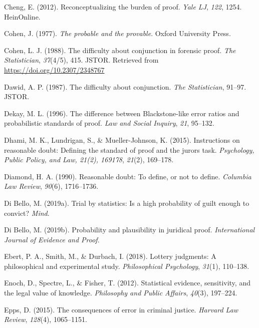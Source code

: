 \documentclass[10pt,dvipsnames,enabledeprecatedfontcommands]{scrartcl}
\begin{document}
\leavevmode\hypertarget{ref-cheng2012reconceptualizing}{}%
Cheng, E. (2012). Reconceptualizing the burden of proof. \emph{Yale LJ},
\emph{122}, 1254. HeinOnline.

\leavevmode\hypertarget{ref-Cohen1977The-probable-an}{}%
Cohen, J. (1977). \emph{The probable and the provable}. Oxford
University Press.

\leavevmode\hypertarget{ref-cohen1988difficulty}{}%
Cohen, L. J. (1988). The difficulty about conjunction in forensic proof.
\emph{The Statistician}, \emph{37}(4/5), 415. JSTOR. Retrieved from
\url{https://doi.org/10.2307/2348767}

\leavevmode\hypertarget{ref-dawid1987difficulty}{}%
Dawid, A. P. (1987). The difficulty about conjunction. \emph{The
Statistician}, 91--97. JSTOR.

\leavevmode\hypertarget{ref-Dekay1996}{}%
Dekay, M. L. (1996). The difference between Blackstone-like error ratios
and probabilistic standards of proof. \emph{Law and Social Inquiry},
\emph{21}, 95--132.

\leavevmode\hypertarget{ref-dhamiEtAl2015}{}%
Dhami, M. K., Lundrigan, S., \& Mueller-Johnson, K. (2015). Instructions
on reasonable doubt: Defining the standard of proof and the jurors task.
\emph{Psychology, Public Policy, and Law, 21(2), 169178}, \emph{21}(2),
169--178.

\leavevmode\hypertarget{ref-diamond90}{}%
Diamond, H. A. (1990). Reasonable doubt: To define, or not to define.
\emph{Columbia Law Review}, \emph{90}(6), 1716--1736.

\leavevmode\hypertarget{ref-diBello2019}{}%
Di Bello, M. (2019a). Trial by statistics: Is a high probability of
guilt enough to convict? \emph{Mind}.

\leavevmode\hypertarget{ref-DiBello2019plausibility}{}%
Di Bello, M. (2019b). Probability and plausibility in juridical proof.
\emph{International Journal of Evidence and Proof}.

\leavevmode\hypertarget{ref-ebert2018}{}%
Ebert, P. A., Smith, M., \& Durbach, I. (2018). Lottery judgments: A
philosophical and experimental study. \emph{Philosophical Psychology},
\emph{31}(1), 110--138.

\leavevmode\hypertarget{ref-Enoch2012Statistical}{}%
Enoch, D., Spectre, L., \& Fisher, T. (2012). Statistical evidence,
sensitivity, and the legal value of knowledge. \emph{Philosophy and
Public Affairs}, \emph{40}(3), 197--224.

\leavevmode\hypertarget{ref-epps2015}{}%
Epps, D. (2015). The consequences of error in criminal justice.
\emph{Harvard Law Review}, \emph{128}(4), 1065--1151.
\end{document}
